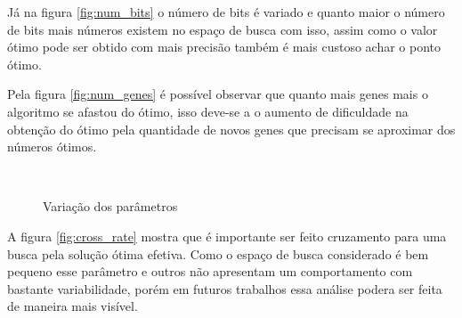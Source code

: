 \documentclass[11pt]{article}
\begin{document}
Já na figura \ref{fig:num_bits} o número de bits é variado e quanto maior o número de bits mais números existem no espaço de busca com isso, assim como o valor ótimo pode ser obtido com mais precisão também é mais custoso achar o ponto ótimo.

Pela figura \ref{fig:num_genes} é possível observar que quanto mais genes mais o algoritmo se afastou do ótimo, isso deve-se a o aumento de dificuldade na obtenção do ótimo pela quantidade de novos genes que precisam se aproximar dos números ótimos.

\begin{figure}[!htb]
	\centering
	~
	\caption{Variação dos parâmetros}
\end{figure}
A figura \ref{fig:cross_rate} mostra que é importante ser feito cruzamento para uma busca pela solução ótima efetiva. Como o espaço de busca considerado é bem pequeno esse parâmetro e outros não apresentam um comportamento com bastante variabilidade, porém em futuros trabalhos essa análise podera ser feita de maneira mais visível.
\end{document}
